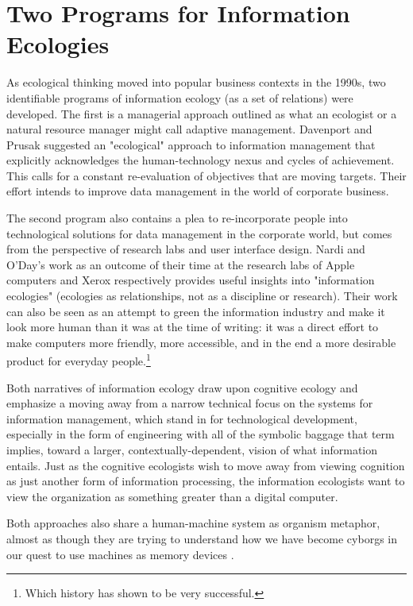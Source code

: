 \section{Two Programs for Information Ecologies}

As ecological thinking moved into popular business contexts in the 1990s, two identifiable programs of information ecology (as a set of relations) were developed. The first is a managerial approach outlined as what an ecologist or a natural resource manager might call adaptive management. Davenport and Prusak suggested an "ecological" approach to information management that explicitly acknowledges the human-technology nexus and cycles of achievement. This calls for a constant re-evaluation of objectives that are moving targets. Their effort intends to improve data management in the world of corporate business. 

The second program also contains a plea to re-incorporate people into technological solutions for data management in the corporate world, but comes from the perspective of research labs and user interface design. Nardi and O'Day's work as an outcome of their time at the research labs of Apple computers and Xerox respectively provides useful insights into "information ecologies" (ecologies as relationships, not as a discipline or research). Their work can also be seen as an attempt to green the information industry and make it look more human than it was at the time of writing: it was a direct effort to make computers more friendly, more accessible, and in the end a more desirable product for everyday people.\footnote{Which history has shown to be very successful.} 

Both narratives of information ecology draw upon cognitive ecology and emphasize a moving away from a narrow technical focus on the systems for information management, which stand in for technological development, especially in the form of engineering with all of the symbolic baggage that term implies, toward a larger, contextually-dependent, vision of what information entails. Just as the cognitive ecologists wish to move away from viewing cognition as just another form of information processing, the information ecologists want to view the organization as something greater than a digital computer. 

Both approaches also share a human-machine system as organism metaphor, almost as though they are trying to understand how we have become cyborgs in our quest to use machines as memory devices \citep[cf.][]{bowker_2005}.

